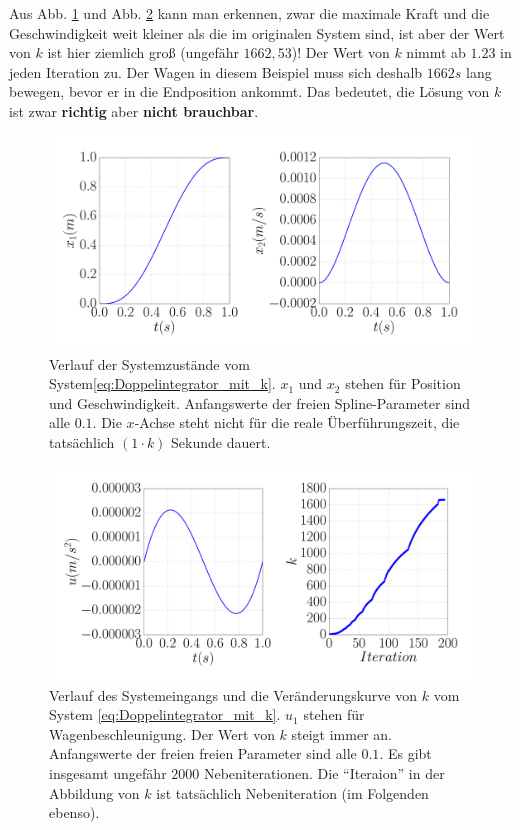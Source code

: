 \begin{beispiel}[Doppelintegrator]
	Aus Abb. \ref{fig:Doppelintegrator_mit_k_x} und Abb. \ref{fig:Doppelintegrator_mit_k_u} kann man erkennen, zwar die maximale Kraft und die Geschwindigkeit weit kleiner als die im originalen System sind, ist aber der Wert von $k$ ist hier ziemlich groß (ungefähr $1662,53$)! Der Wert von $k$ nimmt ab $1.23$ in jeden Iteration zu. Der Wagen in diesem Beispiel muss sich deshalb $1662s$ lang bewegen, bevor er in die Endposition ankommt. Das bedeutet, die Lösung von $k$ ist zwar \textbf{richtig} aber \textbf{nicht brauchbar}.
	\begin{figure}[!h]
		\centering
		\includegraphics[width=0.7\linewidth]{bild/30_32/test0_mit_k_ori_x.pdf}%
		\caption[Verlauf der Systemzustände vom System \eqref{eq:Doppelintegrator_mit_k}.]{Verlauf der Systemzustände vom System\eqref{eq:Doppelintegrator_mit_k}. $x_{1}$ und $x_{2}$ stehen für Position und Geschwindigkeit. Anfangswerte der freien Spline-Parameter sind alle $0.1$. Die $x$-Achse steht nicht für die reale Überführungszeit, die tatsächlich $(1\cdot k)$ Sekunde dauert.}
		\label{fig:Doppelintegrator_mit_k_x}
	\end{figure}
	\begin{figure}[!h]
		\centering
		\includegraphics[width=0.7\linewidth]{bild/30_32/test0_mit_k_ori_u.pdf}%
		\caption[Verlauf des Systemeingangs und die Veränderungskurve von $k$ vom System \eqref{eq:Doppelintegrator_mit_k}.]{Verlauf des Systemeingangs und die Veränderungskurve von $k$ vom System \eqref{eq:Doppelintegrator_mit_k}. $u_{1}$ stehen für Wagenbeschleunigung. Der Wert von $k$ steigt immer an. Anfangswerte der freien freien Parameter sind alle $0.1$. Es gibt insgesamt ungefähr $2000$ Nebeniterationen. Die ``Iteraion'' in der Abbildung von $k$ ist tatsächlich Nebeniteration (im Folgenden ebenso).}
		\label{fig:Doppelintegrator_mit_k_u}
	\end{figure}
	

\end{beispiel}
